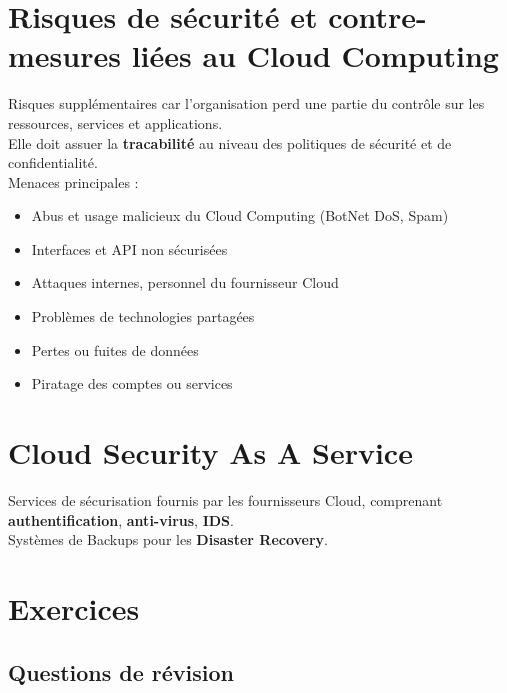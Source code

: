 \documentclass{report}
\begin{document}
	\section{Risques de sécurité et contre-mesures liées au Cloud Computing}

		Risques supplémentaires car l'organisation perd une partie du contrôle sur les ressources, services et applications.\\
		Elle doit assuer la \textbf{tracabilité} au niveau des politiques de sécurité et de confidentialité.\\

		Menaces principales : \\

		\begin{itemize}
			\item Abus et usage malicieux du Cloud Computing (BotNet DoS, Spam)
			\item Interfaces et API non sécurisées
			\item Attaques internes, personnel du fournisseur Cloud
			\item Problèmes de technologies partagées
			\item Pertes ou fuites de données
			\item Piratage des comptes ou services\\
		\end{itemize}

	\section{Cloud Security As A Service}

		Services de sécurisation fournis par les fournisseurs Cloud, comprenant \textbf{authentification}, \textbf{anti-virus}, \textbf{IDS}.\\

		Systèmes de Backups pour les \textbf{Disaster Recovery}.\\
	
	\section{Exercices}

		\subsection{Questions de révision}
\end{document}
